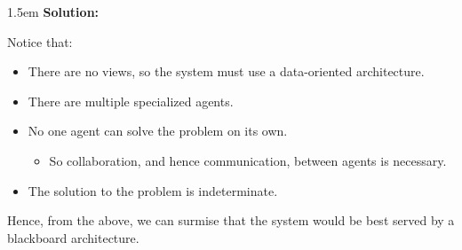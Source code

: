 \documentclass{article}
\newenvironment{solution}{
	\vspace{.5em}
	\par
	\begin{adjustwidth}{1.5em}{}
	\textbf{{Solution:}}
	\par
	\vspace{.5em}
}{
	\vspace{1em}
	\end{adjustwidth}
}
\begin{document}
\begin{solution}
	Notice that:
	\begin{itemize}
		\item There are no views, so the system must use a data-oriented architecture.
		\item There are multiple specialized agents.
		\item No one agent can solve the problem on its own.
		\begin{itemize}
			\item So collaboration, and hence communication, between agents is necessary.
		\end{itemize}
		\item The solution to the problem is indeterminate.
	\end{itemize}

	Hence, from the above, we can surmise that the system would be best served by a blackboard architecture.
\end{solution}























\ifdefined\iscombined
	\newpage
\else
	
\end{document}
